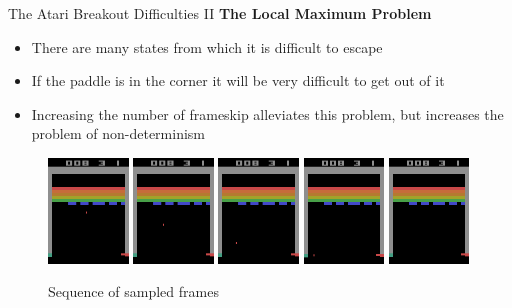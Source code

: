 \begin{frame}{The Atari Breakout Difficulties II}
\textbf{The Local Maximum Problem}
    \begin{itemize}
	\item There are many states from which it is difficult to escape
	\item If the paddle is in the corner it will be very difficult to get out of it
	\item Increasing the number of frameskip alleviates this problem, but increases the problem of non-determinism
    \end{itemize}
	\begin{figure}
		\includegraphics[width=0.19\textwidth]{images/frame-sequence-0.png}
		\includegraphics[width=0.19\textwidth]{images/frame-sequence-1.png}
		\includegraphics[width=0.19\textwidth]{images/frame-sequence-2.png}
		\includegraphics[width=0.19\textwidth]{images/frame-sequence-3.png}
		\includegraphics[width=0.19\textwidth]{images/frame-sequence-4.png}
		\caption{Sequence of sampled frames}
	\end{figure}
\end{frame}

